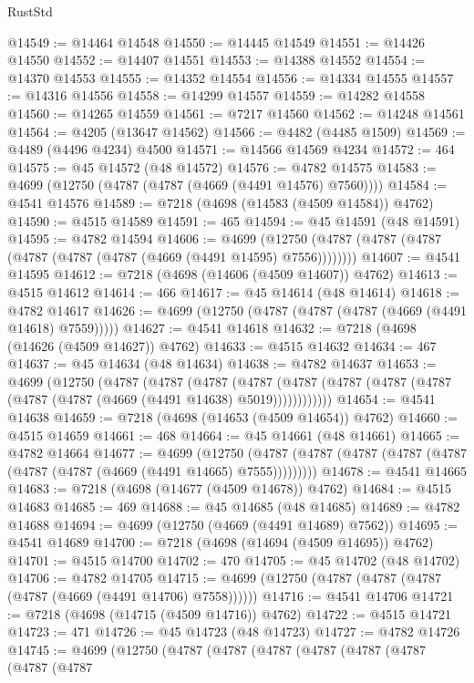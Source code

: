 \begin{lexlean}{RustStd}
\begin{coremodule}
@14549 := @14464 @14548
@14550 := @14445 @14549
@14551 := @14426 @14550
@14552 := @14407 @14551
@14553 := @14388 @14552
@14554 := @14370 @14553
@14555 := @14352 @14554
@14556 := @14334 @14555
@14557 := @14316 @14556
@14558 := @14299 @14557
@14559 := @14282 @14558
@14560 := @14265 @14559
@14561 := @7217 @14560
@14562 := @14248 @14561
@14564 := @4205 (@13647 @14562)
@14566 := @4482 (@4485 @1509)
@14569 := @4489 (@4496 @4234) @4500
@14571 := @14566 @14569 @4234
@14572 := 464
@14575 := @45 @14572 (@48 @14572)
@14576 := @4782 @14575
@14583 := @4699 (@12750 (@4787 (@4787 (@4669 (@4491 @14576) @7560))))
@14584 := @4541 @14576
@14589 := @7218 (@4698 (@14583 (@4509 @14584)) @4762)
@14590 := @4515 @14589
@14591 := 465
@14594 := @45 @14591 (@48 @14591)
@14595 := @4782 @14594
@14606 := @4699
    (@12750 (@4787 (@4787 (@4787 (@4787 (@4787 (@4787 (@4669 (@4491 @14595) @7556))))))))
@14607 := @4541 @14595
@14612 := @7218 (@4698 (@14606 (@4509 @14607)) @4762)
@14613 := @4515 @14612
@14614 := 466
@14617 := @45 @14614 (@48 @14614)
@14618 := @4782 @14617
@14626 := @4699 (@12750 (@4787 (@4787 (@4787 (@4669 (@4491 @14618) @7559)))))
@14627 := @4541 @14618
@14632 := @7218 (@4698 (@14626 (@4509 @14627)) @4762)
@14633 := @4515 @14632
@14634 := 467
@14637 := @45 @14634 (@48 @14634)
@14638 := @4782 @14637
@14653 := @4699
    (@12750
      (@4787
        (@4787
          (@4787
            (@4787 (@4787 (@4787 (@4787 (@4787 (@4787 (@4787 (@4669 (@4491 @14638) @5019))))))))))))
@14654 := @4541 @14638
@14659 := @7218 (@4698 (@14653 (@4509 @14654)) @4762)
@14660 := @4515 @14659
@14661 := 468
@14664 := @45 @14661 (@48 @14661)
@14665 := @4782 @14664
@14677 := @4699
    (@12750 (@4787 (@4787 (@4787 (@4787 (@4787 (@4787 (@4787 (@4669 (@4491 @14665) @7555)))))))))
@14678 := @4541 @14665
@14683 := @7218 (@4698 (@14677 (@4509 @14678)) @4762)
@14684 := @4515 @14683
@14685 := 469
@14688 := @45 @14685 (@48 @14685)
@14689 := @4782 @14688
@14694 := @4699 (@12750 (@4669 (@4491 @14689) @7562))
@14695 := @4541 @14689
@14700 := @7218 (@4698 (@14694 (@4509 @14695)) @4762)
@14701 := @4515 @14700
@14702 := 470
@14705 := @45 @14702 (@48 @14702)
@14706 := @4782 @14705
@14715 := @4699 (@12750 (@4787 (@4787 (@4787 (@4787 (@4669 (@4491 @14706) @7558))))))
@14716 := @4541 @14706
@14721 := @7218 (@4698 (@14715 (@4509 @14716)) @4762)
@14722 := @4515 @14721
@14723 := 471
@14726 := @45 @14723 (@48 @14723)
@14727 := @4782 @14726
@14745 := @4699
    (@12750
      (@4787
        (@4787
          (@4787
            (@4787
              (@4787
                (@4787
                  (@4787
                    (@4787

\end{coremodule}
\end{lexlean}
